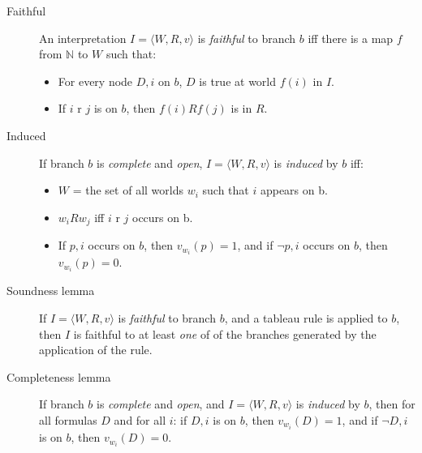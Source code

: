 \documentclass[a4paper]{article}
\begin{document}
\begin{description}
	
	\item[Faithful] An interpretation $I = \langle W, R, v \rangle$ is \emph{faithful} to branch $b$ iff there is a map $f$ from $\mathbb{N}$ to $W$ such that:
	\begin{itemize}
		\item For every node $D, i$ on $b$, $D$ is true at world $f(i)$ in $I$.
		\item If $i$ r $j$ is on $b$, then $f(i)Rf(j)$ is in $R$.
	\end{itemize}

	\item[Induced]  If branch $b$ is \emph{complete} and \emph{open}, $I = \langle W, R, v \rangle$ is \emph{induced} by $b$ iff:
	\begin{itemize}
		\item $W$ = the set of all worlds $w_i$ such that $i$ appears on b.
		\item $w_iRw_j$ iff $i$ r $j$ occurs on b.
		\item If $p, i$ occurs on $b$, then $v_{w_i}(p) = 1$, and if $\lnot p, i$ occurs on  $b$, then $v_{w_i}(p) = 0$.
	\end{itemize}
	
	\item[Soundness lemma] If $I = \langle W, R, v \rangle$ is \emph{faithful} to branch $b$, and a tableau rule is applied to $b$, then $I$ is faithful to at least \emph{one} of of the branches generated by the application of the rule.
	
	\item[Completeness lemma] If branch $b$ is \emph{complete} and \emph{open}, and $I = \langle W, R, v \rangle$ is \emph{induced} by $b$, then for all formulas $D$ and for all $i$: if $D, i$ is on $b$, then $v_{w_i}(D) = 1$, and if $\lnot D, i$ is on $b$, then $v_{w_i}(D) = 0$. 
\end{description}
\end{document}
